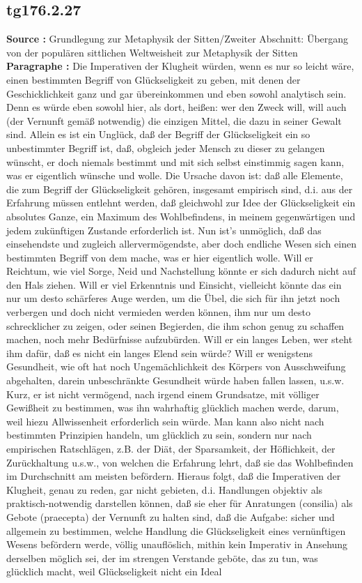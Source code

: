 \documentclass[a4paper,12pt,twoside]{book}
\begin{document}
	\subsection*{tg176.2.27} 
	\textbf{Source : }Grundlegung zur Metaphysik der Sitten/Zweiter Abschnitt: Übergang von der populären sittlichen Weltweisheit zur Metaphysik der Sitten\\  
	
	\textbf{Paragraphe : }Die Imperativen der Klugheit würden, wenn es nur so leicht wäre, einen bestimmten Begriff von Glückseligkeit zu geben, mit denen der Geschicklichkeit ganz und gar übereinkommen und eben sowohl analytisch sein. Denn es würde eben sowohl hier, als dort, heißen: wer den Zweck will, will auch (der Vernunft gemäß notwendig) die einzigen Mittel, die dazu in seiner Gewalt sind. Allein es ist ein Unglück, daß der Begriff der Glückseligkeit ein so unbestimmter Begriff ist, daß, obgleich jeder Mensch zu dieser zu gelangen wünscht, er doch niemals bestimmt und mit sich selbst einstimmig sagen kann, was er eigentlich wünsche und wolle. Die Ursache davon ist: daß alle Elemente, die zum Begriff der Glückseligkeit gehören, insgesamt empirisch sind, d.i. aus der Erfahrung müssen entlehnt werden, daß gleichwohl zur Idee der Glückseligkeit ein absolutes Ganze, ein Maximum des Wohlbefindens, in meinem gegenwärtigen und jedem zukünftigen Zustande erforderlich ist. Nun ist's unmöglich, daß das einsehendste und zugleich allervermögendste, aber doch endliche Wesen sich einen bestimmten Begriff von dem mache, was er hier eigentlich wolle. Will er Reichtum, wie viel Sorge, Neid und Nachstellung könnte er sich dadurch nicht auf den Hals ziehen. Will er viel Erkenntnis und Einsicht, vielleicht könnte das ein nur um desto schärferes Auge werden, um die Übel, die sich für ihn jetzt noch verbergen und doch nicht vermieden werden können, ihm nur  um desto schrecklicher zu zeigen, oder seinen Begierden, die ihm schon genug zu schaffen machen, noch mehr Bedürfnisse aufzubürden. Will er ein langes Leben, wer steht ihm dafür, daß es nicht ein langes Elend sein würde? Will er wenigstens Gesundheit, wie oft hat noch Ungemächlichkeit des Körpers von Ausschweifung abgehalten, darein unbeschränkte Gesundheit würde haben fallen lassen, u.s.w. Kurz, er ist nicht vermögend, nach irgend einem Grundsatze, mit völliger Gewißheit zu bestimmen, was ihn wahrhaftig glücklich machen werde, darum, weil hiezu Allwissenheit erforderlich sein würde. Man kann also nicht nach bestimmten Prinzipien handeln, um glücklich zu sein, sondern nur nach empirischen Ratschlägen, z.B. der Diät, der Sparsamkeit, der Höflichkeit, der Zurückhaltung u.s.w., von welchen die Erfahrung lehrt, daß sie das Wohlbefinden im Durchschnitt am meisten befördern. Hieraus folgt, daß die Imperativen der Klugheit, genau zu reden, gar nicht gebieten, d.i. Handlungen objektiv als praktisch-notwendig darstellen können, daß sie eher für Anratungen (consilia) als Gebote (praecepta) der Vernunft zu halten sind, daß die Aufgabe: sicher und allgemein zu bestimmen, welche Handlung die Glückseligkeit eines vernünftigen Wesens befördern werde, völlig unauflöslich, mithin kein Imperativ in Ansehung derselben möglich sei, der im strengen Verstande geböte, das zu tun, was glücklich macht, weil Glückseligkeit nicht ein Ideal 
\end{document}
